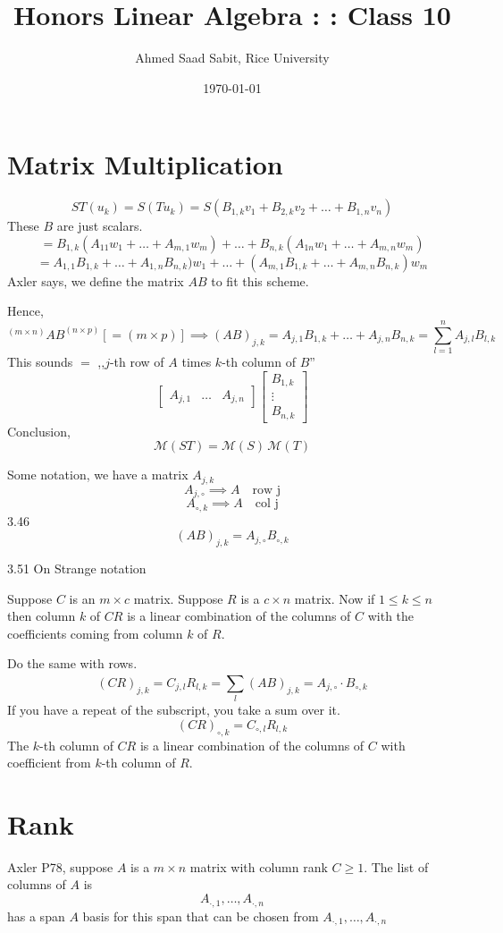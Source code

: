 \documentclass[letter]{article}
\title{Honors Linear Algebra : : Class 10}
\author{Ahmed Saad Sabit, Rice University}
\date{\today}
\begin{document}
\maketitle

\section*{Matrix Multiplication} 
\[
	ST (u_k) = S(T u_k) = S (B_{1,k} v_1 + B_{2,k} v_2 + \ldots + B_{1,n} v_n )
\]
These $B$ are just scalars. 
\[
	= B_{1,k} (A_{11} w_1 + \ldots + A_{m,1} w_m) + \ldots + 
	B_{n,k} (A_{1n} w_1 + \ldots + A_{m,n}w_m)
\]
\[
	= A_{1,1} B_{1, k} + \ldots + A_{1,n} B_{n,k} ) w_1 + 
	\ldots
	+ (A_{m,1} B_{1,k} + \ldots + A_{m,n} B_{n,k} ) w_m 
\] 
Axler says, we define the matrix $AB$ to fit this scheme. 

Hence, 
\[
	^{(m \times n)}AB ^{(n \times p)} [= (m \times p)] \implies (AB)_{j,k} = A_{j,1}B_{1,k} + \ldots + A_{j,n} B_{n,k}  = 
	\sum_{l=1}^{n} A_{j,l} B_{l,k}
\]
This sounds $=$ ,,$j$-th row of $A$ times $k$-th column of $B$''
\[
	\begin{bmatrix} A_{j,1} & \ldots & A_{j,n} \end{bmatrix}  
	\begin{bmatrix} B_{1,k} \\ \vdots \\ B_{n,k} \end{bmatrix} 
\]
Conclusion, 
\[
\mathcal M (ST) = \mathcal M (S) \, \mathcal M (T)
\]

Some notation, we have a matrix $A_{j,k}$ 
\[
	A_{j, \circ } \implies A \quad \text{row j}
\] 
\[
	A_{ \circ, k } \implies A \quad \text{col j}
\] 
3.46 
\[
	(AB) _{j,k} = A_{j, \circ} B_{\circ , k}
\] 

3.51 On Strange notation

Suppose $C$ is an $m \times c$ matrix. Suppose $R$ is a $c \times n$ matrix. Now if $1\le k \le n$ then column $k$ of $CR$ is a linear combination of the columns of $C$ with the coefficients coming from column $k$ of $R$. 

Do the same with rows. 
\[
	(CR)_{j,k} = C_{j,l} R_{l,k} = \sum_{l}^{} (AB)_{j,k} = A_{j, \circ} \cdot B_{\circ, k} 
\]
If you have a repeat of the subscript, you take a sum over it. 
\[
	(CR)_{\circ, k} = C_{\circ, l} R_{l,k}
\]
The $k$-th column of $CR$ is a linear combination of the columns of $C$ with coefficient from $k$-th column of $R$. 

\section*{Rank} 
Axler P78, suppose $A$ is a $m\times n$ matrix with column rank $C \ge 1$. The list of columns of $A$ is 
\[
	A_{\cdot, 1} , \ldots , A_{\cdot ,n}
\]
has a span $A$ basis for this span that can be chosen from $A_{\cdot ,1}, \ldots, A_{\cdot ,n}$
\end{document}
